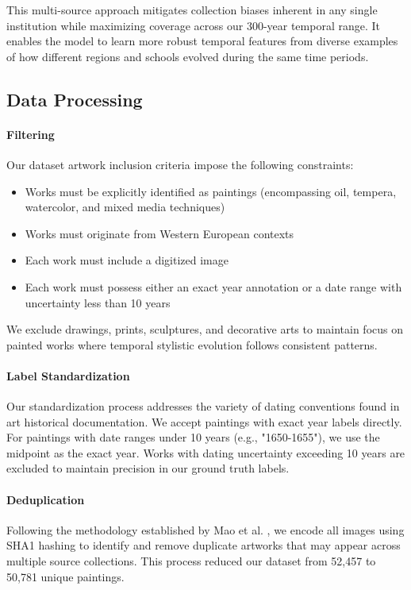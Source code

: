 \documentclass[10pt,twocolumn,letterpaper]{article}
\begin{document}
This multi-source approach mitigates collection biases inherent in any single institution while maximizing coverage across our 300-year temporal range. It enables the model to learn more robust temporal features from diverse examples of how different regions and schools evolved during the same time periods.

\subsection{Data Processing}

\paragraph{Filtering} Our dataset artwork inclusion criteria impose the following constraints:
\begin{itemize}
    \item Works must be explicitly identified as paintings (encompassing oil, tempera, watercolor, and mixed media techniques)
    \item Works must originate from Western European contexts
    \item Each work must include a digitized image
    \item Each work must possess either an exact year annotation or a date range with uncertainty less than 10 years
\end{itemize}
We exclude drawings, prints, sculptures, and decorative arts to maintain focus on painted works where temporal stylistic evolution follows consistent patterns.

\paragraph{Label Standardization} Our standardization process addresses the variety of dating conventions found in art historical documentation. We accept paintings with exact year labels directly. For paintings with date ranges under 10 years (e.g., "1650-1655"), we use the midpoint as the exact year. Works with dating uncertainty exceeding 10 years are excluded to maintain precision in our ground truth labels.

\paragraph{Deduplication} Following the methodology established by Mao et al. \cite{Mao17}, we encode all images using SHA1 hashing to identify and remove duplicate artworks that may appear across multiple source collections. This process reduced our dataset from 52,457 to 50,781 unique paintings.
\end{document}
